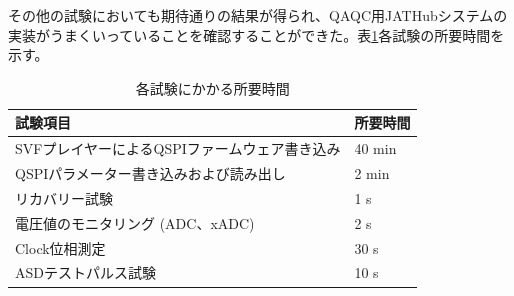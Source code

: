 その他の試験においても期待通りの結果が得られ、QAQC用JATHubシステムの実装がうまくいっていることを確認することができた。表\ref{table_testtime}各試験の所要時間を示す。

\begin{table}[]
    \centering
    \caption{各試験にかかる所要時間}
    \label{table_testtime}    
    \begin{tabular}{ll}
    \hline
    試験項目                          & 所要時間   \\ \hline
    SVFプレイヤーによるQSPIファームウェア書き込み    & 40 min \\
    QSPIパラメーター書き込みおよび読み出し         & 2 min  \\
    リカバリー試験                       & 1 s    \\
    電圧値のモニタリング (ADC、xADC) & 2 s    \\
    Clock位相測定                     & 30 s   \\
    ASDテストパルス試験                   & 10 s  
    \end{tabular}
\end{table}

